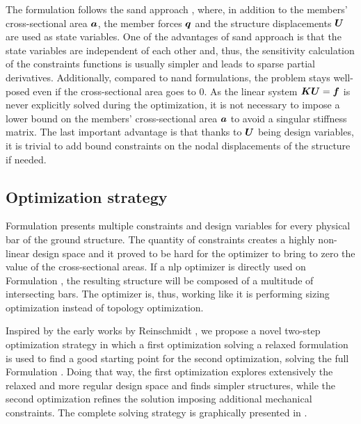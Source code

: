 The formulation follows the \gls{sand} approach , where, in addition to the members' cross-sectional area $\bm{a}$, the member forces $\bm{q}$ and the structure displacements $\bm{U}$ are used as state variables. One of the advantages of \gls{sand} approach is that the state variables are independent of each other and, thus, the sensitivity calculation of the constraints functions is usually simpler and leads to sparse partial derivatives. Additionally, compared to \gls{nand} formulations, the problem stays well-posed even if the cross-sectional area goes to 0. As the linear system $\bm{K}\bm{U}=\bm{f}$ is never explicitly solved during the optimization, it is not necessary to impose a lower bound on the members' cross-sectional area $\bm{a}$ to avoid a singular stiffness matrix. The last important advantage is that thanks to $\bm{U}$ being design variables, it is trivial to add bound constraints on the nodal displacements of the structure if needed.

\subsection{Optimization strategy}
Formulation  presents multiple constraints and design variables for every physical bar of the ground structure. The quantity of constraints creates a highly non-linear design space and it proved to be hard for the optimizer to bring to zero the value of the cross-sectional areas. If a \gls{nlp} optimizer is directly used on Formulation , the resulting structure will be composed of a multitude of intersecting bars. The optimizer is, thus, working like it is performing sizing optimization instead of topology optimization. 

Inspired by the early works by Reinschmidt , we propose a novel two-step optimization strategy in which a first optimization solving a relaxed formulation is used to find a good starting point for the second optimization, solving the full Formulation . Doing that way, the first optimization explores extensively the relaxed and more regular design space and finds simpler structures, while the second optimization refines the solution imposing additional mechanical constraints. The complete solving strategy is graphically presented in .

